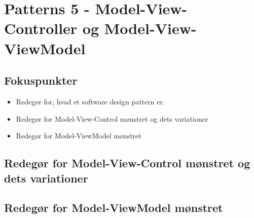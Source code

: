 \section{Patterns 5 - Model-View-Controller og Model-View-ViewModel}

\subsection{Fokuspunkter}

\begin{itemize}
	\item Redegør for, hvad et software design pattern er.
	\item Redegør for Model-View-Control mønstret og dets variationer
	\item Redegør for Model-ViewModel mønstret
\end{itemize}



\subsection{Redegør for Model-View-Control mønstret og dets variationer}

\subsection{Redegør for Model-ViewModel mønstret}